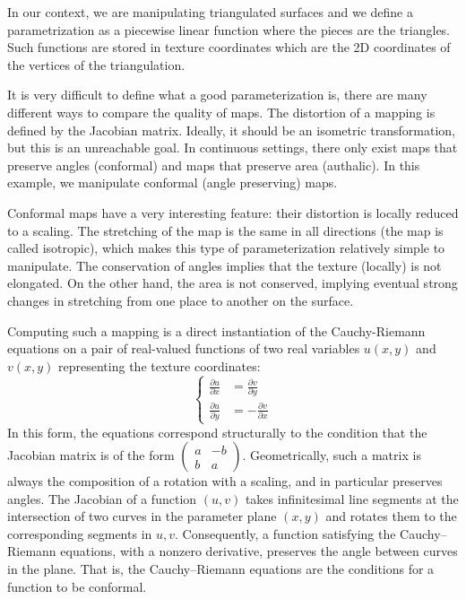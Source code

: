 \documentclass[notitlepage,oneside]{book}
\begin{document}
In our context, we are manipulating triangulated surfaces and we define a parametrization as a piecewise linear function where the pieces are the triangles.
Such functions are stored in texture coordinates which are the 2D coordinates of the vertices of the triangulation.

It is very difficult to define what a good parameterization is, there are many different ways to compare the quality of maps.
The distortion of a mapping is defined by the Jacobian matrix.
Ideally, it should be an isometric transformation, but this is an unreachable goal.
In continuous settings, there only exist maps that preserve angles (conformal) and maps that preserve area (authalic).
In this example, we manipulate conformal (angle preserving) maps.

Conformal maps have a very interesting feature:  their distortion is locally reduced to a scaling.
The stretching of the map is the same in all directions (the map is called isotropic), which makes this type of parameterization relatively simple to manipulate.
The conservation of angles implies that the texture (locally) is not elongated.
On the other hand, the area is not conserved, implying eventual strong changes in stretching from one place to another on the surface.

Computing such a mapping is a direct instantiation of the Cauchy-Riemann equations on a pair of real-valued functions of two real variables $u(x,y)$ and $v(x,y)$ representing the texture coordinates:
$$\left\{
 \begin{array}{rl}
\frac{\partial u}{\partial x} &= \frac{\partial v}{\partial y} \\
\frac{\partial u}{\partial y} &= -\frac{\partial v}{\partial x}
\end{array}
\right.
$$
In this form, the equations correspond structurally to the condition that the Jacobian matrix is of the form
$ \begin{pmatrix}a & -b \\ b &a\end{pmatrix} $.
Geometrically, such a matrix is always the composition of a rotation with a scaling, and in particular preserves angles.
The Jacobian of a function $(u, v)$ takes infinitesimal line segments at the intersection of two curves in the parameter plane $(x,y)$ and rotates them to the corresponding segments in $u,v$.
Consequently, a function satisfying the Cauchy–Riemann equations, with a nonzero derivative, preserves the angle between curves in the plane.
That is, the Cauchy–Riemann equations are the conditions for a function to be conformal.
\end{document}
